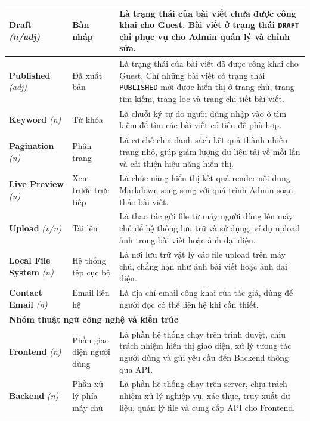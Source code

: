 \documentclass[a4paper,12pt]{article}
\begin{document}
\begin{longtable}{|p{3.5cm}|p{3.5cm}|p{8cm}|}
\textbf{Draft} \textit{(n/adj)} & Bản nháp & Là trạng thái của bài viết chưa được công khai cho Guest. Bài viết ở trạng thái \texttt{DRAFT} chỉ phục vụ cho Admin quản lý và chỉnh sửa. \\
\hline

\textbf{Published} \textit{(adj)} & Đã xuất bản & Là trạng thái của bài viết đã được công khai cho Guest. Chỉ những bài viết có trạng thái \texttt{PUBLISHED} mới được hiển thị ở trang chủ, trang tìm kiếm, trang lọc và trang chi tiết bài viết. \\
\hline

\textbf{Keyword} \textit{(n)} & Từ khóa & Là chuỗi ký tự do người dùng nhập vào ô tìm kiếm để tìm các bài viết có tiêu đề phù hợp. \\
\hline

\textbf{Pagination} \textit{(n)} & Phân trang & Là cơ chế chia danh sách kết quả thành nhiều trang nhỏ, giúp giảm lượng dữ liệu tải về mỗi lần và cải thiện hiệu năng hiển thị. \\
\hline

\textbf{Live Preview} \textit{(n)} & Xem trước trực tiếp & Là chức năng hiển thị kết quả render nội dung Markdown song song với quá trình Admin soạn thảo bài viết. \\
\hline

\textbf{Upload} \textit{(v/n)} & Tải lên & Là thao tác gửi file từ máy người dùng lên máy chủ để hệ thống lưu trữ và sử dụng, ví dụ upload ảnh trong bài viết hoặc ảnh đại diện. \\
\hline

\textbf{Local File System} \textit{(n)} & Hệ thống tệp cục bộ & Là nơi lưu trữ vật lý các file upload trên máy chủ, chẳng hạn như ảnh bài viết hoặc ảnh đại diện. \\
\hline

\textbf{Contact Email} \textit{(n)} & Email liên hệ & Là địa chỉ email công khai của tác giả, dùng để người đọc có thể liên hệ khi cần thiết. \\
\hline

\multicolumn{3}{|l|}{\textbf{Nhóm thuật ngữ công nghệ và kiến trúc}} \\
\hline

\textbf{Frontend} \textit{(n)} & Phần giao diện người dùng & Là phần hệ thống chạy trên trình duyệt, chịu trách nhiệm hiển thị giao diện, xử lý tương tác người dùng và gửi yêu cầu đến Backend thông qua API. \\
\hline

\textbf{Backend} \textit{(n)} & Phần xử lý phía máy chủ & Là phần hệ thống chạy trên server, chịu trách nhiệm xử lý nghiệp vụ, xác thực, truy xuất dữ liệu, quản lý file và cung cấp API cho Frontend. \\
\hline


\end{longtable}
\end{document}
